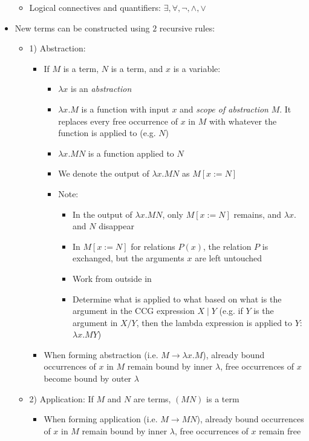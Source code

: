 \begin{itemize}
\begin{itemize}
        \item Logical connectives and quantifiers: $\exists, \forall, \neg, \land, \lor$
    \end{itemize}
    \item New terms can be constructed using $2$ recursive rules:
    \begin{itemize}
        \item 1) Abstraction:
        \begin{itemize}
            \item If $M$ is a term, $N$ is a term, and $x$ is a variable:
            \begin{itemize}
                \item $\lambda x$ is an \emph{abstraction}
                \item $\lambda x.M$ is a function with input $x$ and \emph{scope of abstraction} $M$. It replaces every free occurrence of $x$ in $M$ with whatever the function is applied to (e.g. $N$)
                \item $\lambda x.M N$ is a function applied to $N$
                \item We denote the output of $\lambda x.M N$ as $M[x := N]$
                \item Note: 
                \begin{itemize}
                    \item In the output of $\lambda x.M N$, only $M[x := N]$ remains, and $\lambda x.$ and $N$ disappear
                    \item In $M[x := N]$ for relations $P(x)$, the relation $P$ is exchanged, but the arguments $x$ are left untouched
                    \item Work from outside in
                    \item Determine what is applied to what based on what is the argument in the CCG expression $X \mid Y$ (e.g. if $Y$ is the argument in $X / Y$, then the lambda expression is applied to $Y$: $\lambda x.M Y$)
                \end{itemize}
            \end{itemize}
            \item When forming abstraction (i.e. $M \to \lambda x.M$), already bound occurrences of $x$ in $M$ remain bound by inner $\lambda$, free occurrences of $x$ become bound by outer $\lambda$
        \end{itemize}
        \item 2) Application: If $M$ and $N$ are terms, $(MN)$ is a term
        \begin{itemize}
            \item When forming application (i.e. $M \to MN$), already bound occurrences of $x$ in $M$ remain bound by inner $\lambda$, free occurrences of $x$ remain free
        \end{itemize}
    \end{itemize}
\end{itemize}

